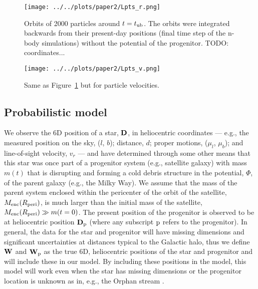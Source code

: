 \documentclass[letterpaper,12pt,preprint]{aastex}
\newcommand{\D}{{\bf D}}
\newcommand{\W}{{\bf W}}
\newcommand{\sat}{{\rm p}}
\newcommand{\tub}{t_{\rm ub}}
\begin{document}
\begin{figure}[h]
\begin{center}
\texttt{[image: ../../plots/paper2/Lpts\_r.png]}
\caption{ Orbits of 2000 particles around $t=\tub$. The orbits were integrated backwards from their present-day positions (final time step of the n-body simulations) without the potential of the progenitor. TODO: coordinates...}\label{fig:lpts_r}
\end{center}
\end{figure}

\begin{figure}[h]
\begin{center}
\texttt{[image: ../../plots/paper2/Lpts\_v.png]}
\caption{ Same as Figure~\ref{fig:lpts_r} but for particle velocities. }\label{fig:lpts_v}
\end{center}
\end{figure}


\subsection{Probabilistic model}
We observe the 6D position of a star, $\D$, in heliocentric coordinates --- e.g., the measured position on the sky, ($l$, $b$); distance, $d$; proper motions, ($\mu_l$, $\mu_b$); and line-of-sight velocity, $v_r$ --- and have determined through some other means that this star was once part of a progenitor system (e.g., satellite galaxy) with mass $m(t)$ that is disrupting and forming a cold debris structure in the potential, $\Phi$, of the parent galaxy (e.g., the Milky Way). We assume that the mass of the parent system enclosed within the pericenter of the orbit of the satellite, $M_{\rm enc}(R_{\rm peri})$, is much larger than the initial mass of the satellite, $M_{\rm enc}(R_{\rm peri})\gg m(t=0)$. The present position of the progenitor is observed to be at heliocentric position $\D_\sat$ (where any subscript $\sat$ refers to the progenitor). In general, the data for the star and progenitor will have missing dimensions and significant uncertainties at distances typical to the Galactic halo, thus we define $\W$ and $\W_\sat$ as the true 6D, heliocentric positions of the star and progenitor and will include these in our model. By including these positions in the model, this model will work even when the star has missing dimensions or the progenitor location is unknown as in, e.g., the Orphan stream \citep{belokurov07}.
\end{document}
